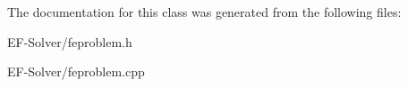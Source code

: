 The documentation for this class was generated from the following files\+:\begin{DoxyCompactItemize}
\item 
E\+F-\/\+Solver/feproblem.\+h\item 
E\+F-\/\+Solver/feproblem.\+cpp\end{DoxyCompactItemize}
